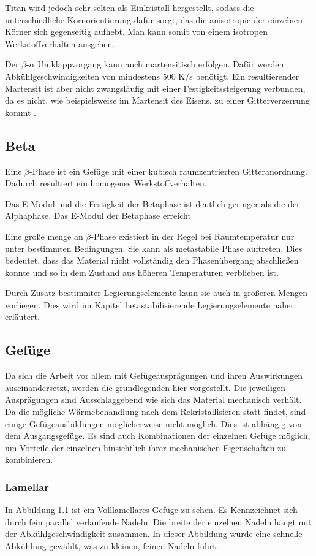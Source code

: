 \documentclass[a4paper, singlepage, 11pt]{tubsreprt}
\begin{document}
Titan wird jedoch sehr selten als Einkristall hergestellt, sodass die unterschiedliche Kornorientierung dafür sorgt, das die anisotropie der einzelnen Körner sich gegenseitig aufhebt. Man kann somit von einem isotropen Werkstoffverhalten ausgehen.

Der $\beta$-$\alpha$ Umklappvorgang kann auch martensitisch erfolgen. Dafür werden Abkühlgeschwindigkeiten von mindestens 500 K/s benötigt. Ein resultierender Martensit ist aber nicht zwangsläufig mit einer Festigkeitssteigerung verbunden, da es nicht, wie beispielsweise im Martensit des Eisens, zu einer Gitterverzerrung kommt \cite[vgl. ]{Siemers2017}.
\subsection{Beta}
Eine $\beta$-Phase ist ein Gefüge mit einer kubisch raumzentrierten Gitteranordnung. Dadurch resultiert ein homogenes Werkstoffverhalten.

Das E-Modul und die Festigkeit der Betaphase ist deutlich geringer als die der Alphaphase. Das E-Modul der Betaphase erreicht

Eine große menge an $\beta$-Phase existiert in der Regel bei Raumtemperatur nur unter bestimmten Bedingungen. Sie kann als metastabile Phase auftreten. Dies bedeutet, dass das Material nicht vollständig den Phasenübergang abschließen konnte und so in dem Zustand aus höheren Temperaturen verblieben ist. 

Durch Zusatz bestimmter Legierungselemente kann sie auch in größeren Mengen vorliegen. Dies wird im Kapitel betastabilisierende Legierungselemente näher erläutert.
\subsection{Gefüge}
Da sich die Arbeit vor allem mit Gefügeausprägungen und ihren Auswirkungen auseinandersetzt, werden die grundlegenden hier vorgestellt. Die jeweiligen Ausprägungen sind Ausschlaggebend wie sich das Material mechanisch verhält. Da die mögliche Wärmebehandlung nach dem Rekristallisieren statt findet, sind einige Gefügeausbildungen möglicherweise nicht möglich. Dies ist abhängig von dem Ausgangsgefüge.
Es sind auch Kombinationen der einzelnen Gefüge möglich, um Vorteile der einzelnen hinsichtlich ihrer mechanischen Eigenschaften zu kombinieren.
\subsubsection{Lamellar}
In Abbildung 1.1 ist ein Volllamellares Gefüge zu sehen. Es Kennzeichnet sich durch fein parallel verlaufende Nadeln. Die breite der einzelnen Nadeln hängt mit der Abkühlgeschwindigkeit zusammen. In dieser Abbildung wurde eine schnelle Abkühlung gewählt, was zu kleinen, feinen Nadeln führt. 
\end{document}
